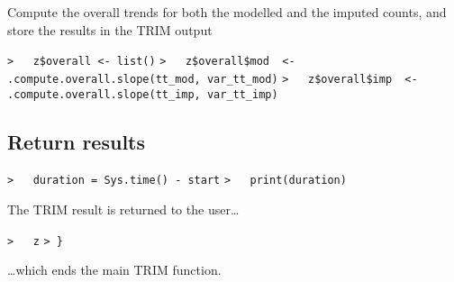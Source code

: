 \documentclass[a4paper]{article}
\begin{document}
Compute the overall trends for both the modelled and the imputed counts, and
store the results in the TRIM output\par
\verb~>   z$overall <- list()~\newline
\verb~>   z$overall$mod  <- .compute.overall.slope(tt_mod, var_tt_mod)~\newline
\verb~>   z$overall$imp  <- .compute.overall.slope(tt_imp, var_tt_imp)~\par



\subsection{Return results}\par

\verb~>   duration = Sys.time() - start~\newline
\verb~>   print(duration)~\par

The TRIM result is returned to the user\ldots\par
\verb~>   z~\newline
\verb~> }~\par
\ldots which ends the main TRIM function.
\end{document}
